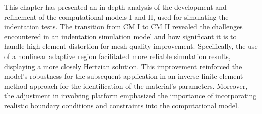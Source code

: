 This chapter has presented an in-depth analysis of the development and refinement of the computational models I and II, used
for simulating the indentation tests. The transition from CM I to CM II revealed the challenges encountered in an indentation 
simulation model and how significant it is to handle high element distortion for mesh quality improvement. 
Specifically, the use of a nonlinear adaptive region facilitated more reliable simulation results, displaying a more 
closely Hertzian solution. This improvement reinforced the model's robustness for the subsequent application in an inverse
finite element method approach for the identification of the material's parameters. Moreover, the adjustment in involving platform
emphasized the importance of incorporating realistic boundary conditions and constraints into the computational model.




